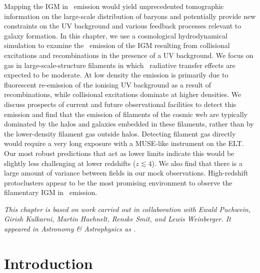     \fancyhf{}
    \fancyfoot[C]{\color{white}\thepage}
    \newpage
    \setFancyHdr
\fi


\vspace*{\fill}

\noindent Mapping the IGM in \lya\ emission would yield unprecedented tomographic information on the large-scale distribution of baryons and potentially provide new constraints on the UV background and various feedback processes relevant to galaxy formation. In this chapter, we use a cosmological hydrodynamical simulation to examine the \lya\ emission of the IGM resulting from collisional excitations and recombinations in the presence of a UV background. We focus on gas in large-scale-structure filaments in which \lya\ radiative transfer effects are expected to be moderate. At low density the emission is primarily due to fluorescent re-emission of the ionising UV background as a result of recombinations, while collisional excitations dominate at higher densities. We discuss prospects of current and future observational facilities to detect this emission and find that the emission of filaments of the cosmic web are typically dominated by the halos and galaxies embedded in these filaments, rather than by the lower-density filament gas outside halos. Detecting filament gas directly would require a very long exposure with a MUSE-like instrument on the ELT. Our most robust predictions that act as lower limits indicate this would be slightly less challenging at lower redshifts ($z \lesssim 4$). We also find that there is a large amount of variance between fields in our mock observations. High-redshift protoclusters appear to be the most promising environment to observe the filamentary IGM in \lymana\ emission.

\vspace{3ex}
\begin{mdframed}[backgroundcolor=black!2.5]
    \textsl{This chapter is based on work carried out in collaboration with Ewald Puchwein, Girish Kulkarni, Martin Haehnelt, Renske Smit, and Lewis Weinberger. It appeared in Astronomy \& Astrophysics as \citet*{2021A&A...650A..98W}.}
\end{mdframed}
\vspace*{\fill}

\newpage

\section{Introduction}
\label{chPsec:Introduction}

